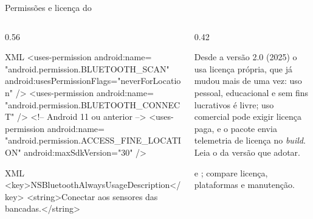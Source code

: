\documentclass[aspectratio=169,10pt]{beamer}
\begin{document}
\begin{frame}[fragile]{Permissões e licença do }
  \begin{columns}[T]
    \begin{column}{0.56\textwidth}
\begin{codigo}[title=AndroidManifest.xml]{XML}
<uses-permission android:name=
    "android.permission.BLUETOOTH_SCAN"
    android:usesPermissionFlags="neverForLocation" />
<uses-permission android:name=
    "android.permission.BLUETOOTH_CONNECT" />
<!-- Android 11 ou anterior -->
<uses-permission android:name=
    "android.permission.ACCESS_FINE_LOCATION"
    android:maxSdkVersion="30" />
\end{codigo}
\begin{codigo}[title=Info.plist]{XML}
<key>NSBluetoothAlwaysUsageDescription</key>
<string>Conectar aos sensores das bancadas.</string>
\end{codigo}
    \end{column}
    \begin{column}{0.42\textwidth}
      \begin{atencao}
        Desde a versão 2.0 (2025) o  usa licença própria, que já mudou mais de uma vez: uso pessoal, educacional e sem fins lucrativos é livre; uso comercial pode exigir licença paga, e o pacote envia telemetria de licença no \emph{build}. Leia o  da versão que adotar.
      \end{atencao}
      \begin{dica}[Alternativas]
         e ; compare licença, plataformas e manutenção.
      \end{dica}
    \end{column}
  \end{columns}
\end{frame}
\end{document}
